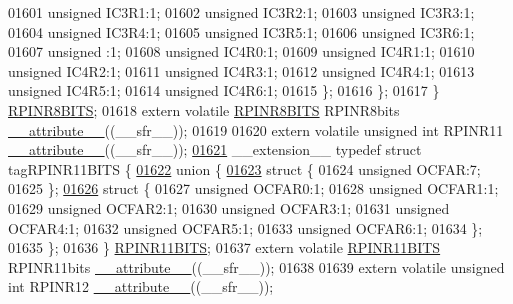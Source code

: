 \begin{DoxyCode}
01601       \textcolor{keywordtype}{unsigned} IC3R1:1;
01602       \textcolor{keywordtype}{unsigned} IC3R2:1;
01603       \textcolor{keywordtype}{unsigned} IC3R3:1;
01604       \textcolor{keywordtype}{unsigned} IC3R4:1;
01605       \textcolor{keywordtype}{unsigned} IC3R5:1;
01606       \textcolor{keywordtype}{unsigned} IC3R6:1;
01607       \textcolor{keywordtype}{unsigned} :1;
01608       \textcolor{keywordtype}{unsigned} IC4R0:1;
01609       \textcolor{keywordtype}{unsigned} IC4R1:1;
01610       \textcolor{keywordtype}{unsigned} IC4R2:1;
01611       \textcolor{keywordtype}{unsigned} IC4R3:1;
01612       \textcolor{keywordtype}{unsigned} IC4R4:1;
01613       \textcolor{keywordtype}{unsigned} IC4R5:1;
01614       \textcolor{keywordtype}{unsigned} IC4R6:1;
01615     \};
01616   \};
01617 \} \hyperlink{a00008_dc/d85/a00736}{RPINR8BITS};
01618 \textcolor{keyword}{extern} \textcolor{keyword}{volatile} \hyperlink{a00008_dc/d85/a00736}{RPINR8BITS} RPINR8bits \hyperlink{a00009_a493c46f03454991ccc5aa7a6e1dfb2a7}{\_\_attribute\_\_}((\_\_sfr\_\_));
01619 
01620 \textcolor{keyword}{extern} \textcolor{keyword}{volatile} \textcolor{keywordtype}{unsigned} \textcolor{keywordtype}{int}  RPINR11 \hyperlink{a00009_a493c46f03454991ccc5aa7a6e1dfb2a7}{\_\_attribute\_\_}((\_\_sfr\_\_));
\hypertarget{a00009_source_l01621}{}\hyperlink{a00008}{01621} \_\_extension\_\_ \textcolor{keyword}{typedef} \textcolor{keyword}{struct }tagRPINR11BITS \{
\hypertarget{a00009_source_l01622}{}\hyperlink{a00009}{01622}   \textcolor{keyword}{union }\{
\hypertarget{a00009_source_l01623}{}\hyperlink{a00009}{01623}     \textcolor{keyword}{struct }\{
01624       \textcolor{keywordtype}{unsigned} OCFAR:7;
01625     \};
\hypertarget{a00009_source_l01626}{}\hyperlink{a00009}{01626}     \textcolor{keyword}{struct }\{
01627       \textcolor{keywordtype}{unsigned} OCFAR0:1;
01628       \textcolor{keywordtype}{unsigned} OCFAR1:1;
01629       \textcolor{keywordtype}{unsigned} OCFAR2:1;
01630       \textcolor{keywordtype}{unsigned} OCFAR3:1;
01631       \textcolor{keywordtype}{unsigned} OCFAR4:1;
01632       \textcolor{keywordtype}{unsigned} OCFAR5:1;
01633       \textcolor{keywordtype}{unsigned} OCFAR6:1;
01634     \};
01635   \};
01636 \} \hyperlink{a00008_db/dde/a00691}{RPINR11BITS};
01637 \textcolor{keyword}{extern} \textcolor{keyword}{volatile} \hyperlink{a00008_db/dde/a00691}{RPINR11BITS} RPINR11bits \hyperlink{a00009_a493c46f03454991ccc5aa7a6e1dfb2a7}{\_\_attribute\_\_}((\_\_sfr\_\_));
01638 
01639 \textcolor{keyword}{extern} \textcolor{keyword}{volatile} \textcolor{keywordtype}{unsigned} \textcolor{keywordtype}{int}  RPINR12 \hyperlink{a00009_a493c46f03454991ccc5aa7a6e1dfb2a7}{\_\_attribute\_\_}((\_\_sfr\_\_));

\end{DoxyCode}
